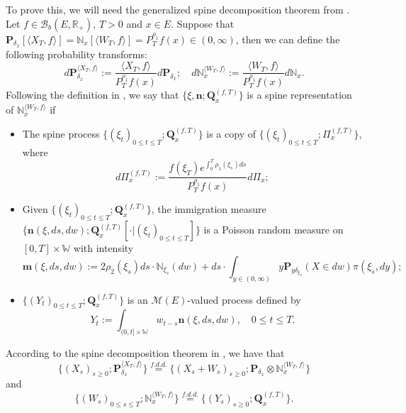 \documentclass[12pt,a4paper]{amsart}
\theoremstyle{plain}
\theoremstyle{definition}
\numberwithin{equation}{section}
\begin{document}
    To prove this, we will need the generalized spine decomposition theorem from \cite{RenSongSun2017Spine}. 
    Let $f\in \mathcal B_b(E,\mathbb R_+)$, $T >0$ and $x\in E$.
    Suppose that $\mathbf P_{\delta_x}[\langle X_T, f\rangle] = \mathbb N_x[\langle W_T, f\rangle] = P^{\rho_1}_T f(x) \in (0,\infty)$, then we can define the following probability transforms:
\begin{equation}
    d\mathbf P_{\delta_x}^{\langle X_T, f\rangle}
    := \frac{\langle X_T, f\rangle}{P_T^{\rho_1} f(x)} d\mathbf P_{\delta_x};
    \quad d\mathbb N_x^{\langle W_T, f\rangle}
    :=  \frac{\langle W_T, f\rangle}{P_T^{\rho_1} f(x)} d\mathbb N_x.
\end{equation}
    Following the definition in \cite{RenSongSun2017Spine}, we say that $\{\xi, \mathbf n;\mathbf Q_{x}^{(f,T)}\}$ is a spine representation of $\mathbb N_x^{\langle W_T, f\rangle}$ if
\begin{itemize}
\item
    The spine process $\{(\xi_t)_{0\leq t\leq T}; \mathbf Q^{(f,T)}_x\}$ is a copy of $\{(\xi_t)_{0\leq t\leq T}; \Pi^{(f,T)}_{x}\}$,
    where
\begin{equation}
    d\Pi_x^{(f,T)} := \frac{f(\xi_T)e^{\int_0^T \rho_1(\xi_s)ds}}{P^{\rho_1}_T f(x)} d \Pi_x;
\end{equation}
\item
    Given $\{(\xi_t)_{0\leq t\leq T}; \mathbf Q^{(f,T)}_x\}$, the immigration measure $\{\mathbf n(\xi,ds,dw); \mathbf Q^{(f,T)}_x[\cdot |(\xi_t)_{0\leq t\leq T}]\}$ is a Poisson random measure on $[0,T] \times \mathbb W$ with intensity
\begin{equation}
\label{eq: conditional intensity}
    \mathbf m(\xi,ds,dw)
    := 2 \rho_2(\xi_s) ds \cdot \mathbb N_{\xi_s}(dw) + ds \cdot \int_{y\in (0,\infty)} y \mathbf P_{y\delta_{\xi_s}}(X\in dw) \pi(\xi_s,dy);
\end{equation}
\item
    $\{(Y_t)_{0\leq t\leq T}; \mathbf Q^{(f,T)}_x\}$ is an $\mathcal M(E)$-valued process defined by
\begin{equation}
    Y_t
    := \int_{(0,t] \times \mathbb W} w_{t-s} \mathbf n(\xi,ds,dw),
    \quad 0 \leq t\leq T.
\end{equation}
\end{itemize}
    According to the spine decomposition theorem in \cite{RenSongSun2017Spine}, we have that
\begin{equation}
\label{eq: Spine decomposition 1}
    \{(X_s)_{s \geq 0};\mathbf P_{\delta_x}^{\langle X_T, f\rangle}\}
    \overset{f.d.d.}{=} \{(X_s + W_s)_{s \geq 0};\mathbf P_{\delta_x} \otimes \mathbb N_x^{\langle W_T, f\rangle} \}
\end{equation}
    and
\begin{equation}
\label{eq: Spine decomposition 2}
    \{(W_s)_{0\leq s\leq T};\mathbb N_x^{\langle W_T, f\rangle}\}
    \overset{f.d.d.}{=} \{(Y_s)_{s \geq 0};\mathbf Q_x^{(f,T)}\}.
\end{equation}
\end{document}
